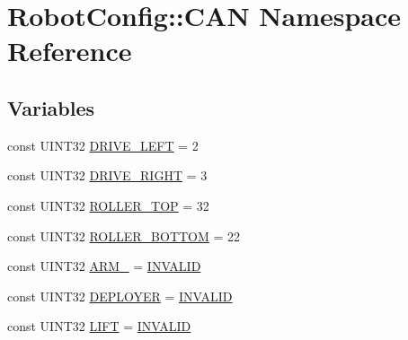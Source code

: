 \hypertarget{namespace_robot_config_1_1_c_a_n}{
\section{\-Robot\-Config\-:\-:\-C\-A\-N \-Namespace \-Reference}
\label{namespace_robot_config_1_1_c_a_n}
}
\subsection*{\-Variables}
\begin{DoxyCompactItemize}
\item 
const \-U\-I\-N\-T32 \hyperlink{namespace_robot_config_1_1_c_a_n_abd56915fd8e3661a8011badad14627ba}{\-D\-R\-I\-V\-E\-\_\-\-L\-E\-F\-T} = 2
\item 
const \-U\-I\-N\-T32 \hyperlink{namespace_robot_config_1_1_c_a_n_a56a851e297a226bb233958cf7d12c218}{\-D\-R\-I\-V\-E\-\_\-\-R\-I\-G\-H\-T} = 3
\item 
const \-U\-I\-N\-T32 \hyperlink{namespace_robot_config_1_1_c_a_n_ae144836fc1fc77eff0dbb6552df1f586}{\-R\-O\-L\-L\-E\-R\-\_\-\-T\-O\-P} = 32
\item 
const \-U\-I\-N\-T32 \hyperlink{namespace_robot_config_1_1_c_a_n_a00a6f050aa076b78610872916c56906e}{\-R\-O\-L\-L\-E\-R\-\_\-\-B\-O\-T\-T\-O\-M} = 22
\item 
const \-U\-I\-N\-T32 \hyperlink{namespace_robot_config_1_1_c_a_n_a6aa8b5ee7bd3978115473af20739e033}{\-A\-R\-M\-\_\-} = \hyperlink{namespace_robot_config_a535035734aeb0aa089cd83f2282630d6}{\-I\-N\-V\-A\-L\-I\-D}
\item 
const \-U\-I\-N\-T32 \hyperlink{namespace_robot_config_1_1_c_a_n_aeb77c82d481db85b088a02efb584ae12}{\-D\-E\-P\-L\-O\-Y\-E\-R} = \hyperlink{namespace_robot_config_a535035734aeb0aa089cd83f2282630d6}{\-I\-N\-V\-A\-L\-I\-D}
\item 
const \-U\-I\-N\-T32 \hyperlink{namespace_robot_config_1_1_c_a_n_a0beadbab6757813816cb707dfd3de0a9}{\-L\-I\-F\-T} = \hyperlink{namespace_robot_config_a535035734aeb0aa089cd83f2282630d6}{\-I\-N\-V\-A\-L\-I\-D}
\end{DoxyCompactItemize}


